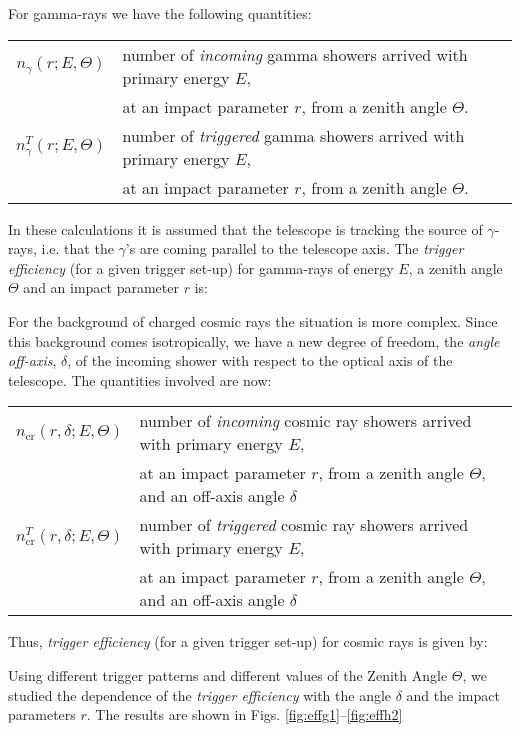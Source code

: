 For gamma-rays we have the following quantities:
%
\begin{center}
  \begin{tabular}{cl}
    $n_\gamma(r;E,\Theta)$ & number of \emph{incoming} 
    gamma showers arrived with primary energy $E$, \\
    & at an impact parameter $r$, from a zenith angle $\Theta$.\\
    $n_\gamma^T(r;E,\Theta)$ & number of \emph{triggered} 
    gamma showers arrived with primary energy $E$, \\
    & at an impact parameter $r$, from a zenith angle $\Theta$.\\
  \end{tabular}
\end{center}
%
In these calculations it is assumed that the telescope is tracking the
source of $\gamma$-rays, i.e. that the $\gamma$'s are coming parallel
to the telescope axis.  The \emph{trigger efficiency} (for a given
trigger set-up) for gamma-rays of energy $E$, a zenith angle $\Theta$
and an impact parameter $r$ is:
%
\effgammaeq

For the background of charged cosmic rays the situation is more
complex. Since this background comes isotropically, we have a new
degree of freedom, the \emph{angle off-axis}, $\delta$, of the
incoming shower with respect to the optical axis of the telescope. The
quantities involved are now:
%
\begin{center}
  \begin{tabular}{cl}
    $n_{\mathrm{cr}}(r,\delta;E,\Theta)$ & number of \emph{incoming} 
    cosmic ray showers arrived with primary energy $E$, \\
    & at an impact parameter $r$, from a zenith angle $\Theta$,
    and an off-axis angle $\delta$\\
    $n_{\mathrm{cr}}^T(r,\delta;E,\Theta)$ & number of \emph{triggered} 
    cosmic ray showers arrived with primary energy $E$, \\
    & at an impact parameter $r$, from a zenith angle $\Theta$,
    and an off-axis angle $\delta$\\
  \end{tabular}
\end{center}
%
Thus, \emph{trigger efficiency} (for a given trigger set-up) for
cosmic rays is given by:
%
\effcreq

Using different trigger patterns and different values of the Zenith
Angle $\Theta$, we studied the dependence of the \emph{trigger
  efficiency} with the angle $\delta$ and the impact parameters $r$.
The results are shown in Figs. \ref{fig:effg1}--\ref{fig:effh2}

